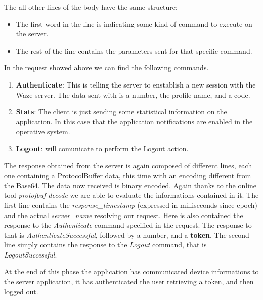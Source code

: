 			\par The all other lines of the body have the same structure: 
			\begin{itemize}
				\item The first word in the line is indicating some kind of command to execute on the server.
				\item The rest of the line contains the parameters sent for that specific command. 
			\end{itemize} 
			In the request showed above we can find the following commands.\newline
			\begin{enumerate}
				\item \textbf{Authenticate}: This is telling the server to enstablish a new session with the Waze server. The data sent with is a number, the profile name, and a code.\newline
				\item \textbf{Stats}: The client is just sending some statistical information on the application. In this case that the application notifications are enabled in the operative system.\newline
				\item \textbf{Logout}: will comunicate to perform the Logout action.	\newline
			\end{enumerate}
			\par The response obtained from the server is again composed of different lines, each one containing a ProtocolBuffer data, this time with an encoding different from the Base64. The data now received is binary encoded. \newline 
			Again thanks to the online tool \textit{protofbuf-decode} we are able to evaluate the informations contained in it.\newline
			The first line contains the \textit{response\_timestamp} (expressed in milliseconds since epoch) and the actual \textit{server\_name} resolving our request. Here is also contained the response to the \textit{Authenticate} command specified in the request. The response to that is \textit{AuthenticateSuccessful}, followed by a number, and a \textbf{token}.\newline
			The second line simply contains the response to the \textit{Logout} command, that is \textit{LogoutSuccessful}. \newline
			\par At the end of this phase the application has communicated device informations to the server application, it has authenticated the user retrieving a token, and then logged out. 
			
